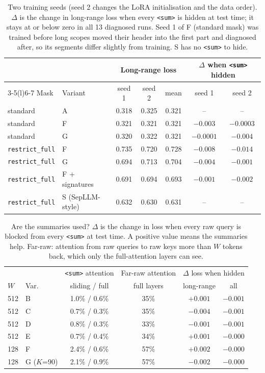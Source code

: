 \documentclass[10pt,twocolumn]{article}
\newcommand{\sumtok}{\texttt{<sum>}}
\begin{document}
\begin{table}[t]
\centering
\caption{Two training seeds (seed 2 changes the LoRA initialisation and the
data order). $\Delta$ is the change in long-range loss when every \sumtok{}
is hidden at test time; it stays at or below zero in all 13 diagnosed runs.
Seed 1 of F (standard mask) was trained before long scopes moved their
header into the first part and diagnosed after, so its segments differ
slightly from training. S has no \sumtok{} to hide.}\small
\begin{tabular}{@{}llccccc@{}}
\toprule
& & \multicolumn{3}{c}{Long-range loss} & \multicolumn{2}{c}{$\Delta$ when \sumtok{} hidden} \\
\cmidrule(lr){3-5}\cmidrule(l){6-7}
Mask & Variant & seed 1 & seed 2 & mean & seed 1 & seed 2 \\
\midrule
standard & A & 0.318 & 0.325 & 0.321 & -- & -- \\
standard & F & 0.321 & 0.321 & 0.321 & $-0.003$ & $-0.0003$ \\
standard & G & 0.320 & 0.322 & 0.321 & $-0.0001$ & $-0.004$ \\
\texttt{restrict\_full} & F & 0.735 & 0.720 & 0.728 & $-0.008$ & $-0.014$ \\
\texttt{restrict\_full} & G & 0.694 & 0.713 & 0.704 & $-0.004$ & $-0.001$ \\
\texttt{restrict\_full} & F + signatures & 0.691 & 0.694 & 0.693 & $-0.001$ & $-0.002$ \\
\texttt{restrict\_full} & S (SepLLM-style) & 0.632 & 0.630 & 0.631 & -- & -- \\
\bottomrule
\end{tabular}

\label{tab:seeds}
\end{table}

\begin{table}[t]
\centering
\caption{Are the summaries used? $\Delta$ is the change in loss when every raw
query is blocked from every \sumtok{} at test time. A positive value means the
summaries help. Far-raw: attention from raw queries to raw keys more than $W$
tokens back, which only the full-attention layers can see.}\small
\begin{tabular}{@{}llcccc@{}}
\toprule
& & \sumtok{} attention & Far-raw attention & \multicolumn{2}{c}{$\Delta$ loss when hidden} \\
$W$ & Var. & sliding / full & full layers & long-range & all \\
\midrule
512 & B & 1.0\% / 0.6\% & 35\% & $+0.001$ & $-0.001$ \\
512 & C & 0.7\% / 0.3\% & 35\% & $-0.004$ & $-0.001$ \\
512 & D & 0.8\% / 0.3\% & 33\% & $-0.001$ & $-0.001$ \\
512 & E & 0.7\% / 0.4\% & 34\% & $+0.001$ & $-0.000$ \\
128 & F & 2.4\% / 0.6\% & 57\% & $+0.002$ & $-0.000$ \\
128 & G ($K$=90) & 2.1\% / 0.9\% & 57\% & $-0.002$ & $-0.000$ \\
\bottomrule
\end{tabular}

\label{tab:diag}
\end{table}
\end{document}
